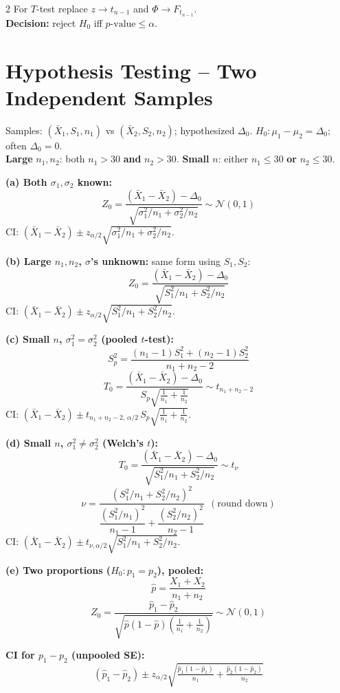\documentclass[9pt,a4paper]{extarticle}
\newcommand{\sh}[1]{\textbf{\color{BrickRed} #1}}
\begin{document}
\begin{multicols*}{2}
For $T$-test replace $z\!\to\! t_{n-1}$ and $\Phi\!\to\! F_{t_{n-1}}$.\\
\sh{Decision:} reject $H_0$ iff $p\text{-value}\le\alpha$.

\columnbreak

\section{Hypothesis Testing -- Two Independent Samples}

Samples: $(\bar{X}_1,S_1,n_1)$ vs $(\bar{X}_2,S_2,n_2)$; hypothesized $\Delta_0$. $H_0:\mu_1-\mu_2=\Delta_0$; often $\Delta_0=0$.\\
\textbf{Large} $n_1,n_2$: both $n_1>30$ \textbf{and} $n_2>30$. \quad \textbf{Small} $n$: either $n_1\!\le\!30$ \textbf{or} $n_2\!\le\!30$.

\sh{(a) Both $\sigma_1,\sigma_2$ known:}
\[
Z_0=\frac{(\bar{X}_1-\bar{X}_2)-\Delta_0}{\sqrt{\sigma_1^{2}/n_1+\sigma_2^{2}/n_2}}\sim\mathcal{N}(0,1)
\]
CI: $(\bar{X}_1-\bar{X}_2)\pm z_{\alpha/2}\sqrt{\sigma_1^{2}/n_1+\sigma_2^{2}/n_2}$.

\sh{(b) Large $n_1,n_2$, $\sigma$'s unknown:} same form using $S_1,S_2$:
\[
Z_0=\frac{(\bar{X}_1-\bar{X}_2)-\Delta_0}{\sqrt{S_1^{2}/n_1+S_2^{2}/n_2}}
\]
CI: $(\bar{X}_1-\bar{X}_2)\pm z_{\alpha/2}\sqrt{S_1^{2}/n_1+S_2^{2}/n_2}$.

\sh{(c) Small $n$, $\sigma_1^{2}=\sigma_2^{2}$ (pooled $t$-test):}
\[
S_p^{2}=\frac{(n_1-1)S_1^{2}+(n_2-1)S_2^{2}}{n_1+n_2-2}
\]
\[
T_0=\frac{(\bar{X}_1-\bar{X}_2)-\Delta_0}{S_p\sqrt{\tfrac{1}{n_1}+\tfrac{1}{n_2}}}\sim t_{n_1+n_2-2}
\]
CI: $(\bar{X}_1-\bar{X}_2)\pm t_{n_1+n_2-2,\,\alpha/2}\,S_p\sqrt{\tfrac{1}{n_1}+\tfrac{1}{n_2}}$.

\sh{(d) Small $n$, $\sigma_1^{2}\ne \sigma_2^{2}$ (Welch's $t$):}
\[
T_0=\frac{(\bar{X}_1-\bar{X}_2)-\Delta_0}{\sqrt{S_1^{2}/n_1+S_2^{2}/n_2}}\sim t_\nu
\]
\[
\nu=\frac{\left(S_1^{2}/n_1+S_2^{2}/n_2\right)^{2}}{\dfrac{(S_1^{2}/n_1)^{2}}{n_1-1}+\dfrac{(S_2^{2}/n_2)^{2}}{n_2-1}}\ \ (\text{round down})
\]
CI: $(\bar{X}_1-\bar{X}_2)\pm t_{\nu,\alpha/2}\sqrt{S_1^{2}/n_1+S_2^{2}/n_2}$.

\sh{(e) Two proportions ($H_0:p_1=p_2$), pooled:}
\[
\hat{p}=\frac{X_1+X_2}{n_1+n_2}
\]
\[
Z_0=\frac{\hat{p}_1-\hat{p}_2}{\sqrt{\hat{p}(1-\hat{p})\!\left(\tfrac{1}{n_1}+\tfrac{1}{n_2}\right)}}\sim\mathcal{N}(0,1)
\]

\sh{CI for $p_1-p_2$ (unpooled SE):}
\[
(\hat{p}_1-\hat{p}_2)\pm z_{\alpha/2}\sqrt{\tfrac{\hat{p}_1(1-\hat{p}_1)}{n_1}+\tfrac{\hat{p}_2(1-\hat{p}_2)}{n_2}}
\]


\end{multicols*}
\end{document}
